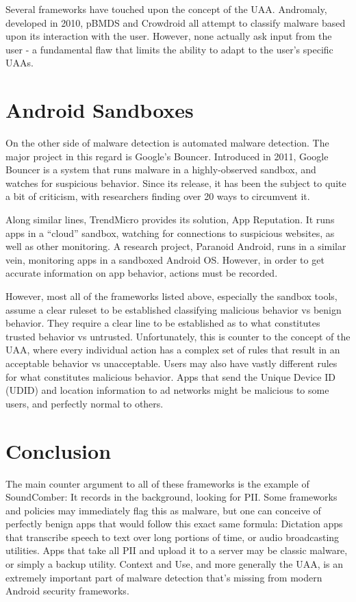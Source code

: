Several frameworks have touched upon the concept of the UAA. Andromaly\citep{shabtai2012andromaly}, developed in 2010, pBMDS\citep{xie2010pbmds} and Crowdroid\citep{burguera2011crowdroid} all attempt to classify malware based upon its interaction with the user. However, none actually ask input from the user - a fundamental flaw that limits the ability to adapt to the user's specific UAAs.

\section{Android Sandboxes}
On the other side of malware detection is automated malware detection. The major project in this regard is Google's Bouncer\citep{googlebouncer}. Introduced in 2011, Google Bouncer is a system that runs malware in a highly-observed sandbox, and watches for suspicious behavior. Since its release, it has been the subject to quite a bit of criticism\citep{mansfield2012android}, with researchers finding over 20 ways to circumvent it.

Along similar lines, TrendMicro provides its solution, App Reputation\citep{trendmicroappreputation}. It runs apps in a ``cloud'' sandbox, watching for connections to suspicious websites, as well as other monitoring. A research project, Paranoid Android\citep{portokalidis2010paranoid}, runs in a similar vein, monitoring apps in a sandboxed Android OS. However, in order to get accurate information on app behavior, actions must be recorded.

However, most all of the frameworks listed above, especially the sandbox tools, assume a clear ruleset to be established classifying malicious behavior vs benign behavior. They require a clear line to be established as to what constitutes trusted behavior vs untrusted. Unfortunately, this is counter to the concept of the UAA, where every individual action has a complex set of rules that result in an acceptable behavior vs unacceptable. Users may also have vastly different rules for what constitutes malicious behavior. Apps that send the Unique Device ID (UDID) and location information to ad networks might be malicious to some users, and perfectly normal to others.


\section{Conclusion}
The main counter argument to all of these frameworks is the example of SoundComber: It records in the background, looking for PII. Some frameworks and policies may immediately flag this as malware, but one can conceive of perfectly benign apps that would follow this exact same formula: Dictation apps that transcribe speech to text over long portions of time, or audio broadcasting utilities. Apps that take all PII and upload it to a server may be classic malware, or simply a backup utility. Context and Use, and more generally the UAA, is an extremely important part of malware detection that's missing from modern Android security frameworks.
